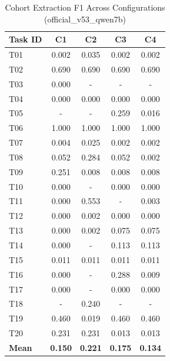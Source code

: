 \begin{table}[htbp]
\centering
\caption{Cohort Extraction F1 Across Configurations (official_v53_qwen7b)}
\label{tab:official_v53_qwen7b}
\begin{tabular}{lcccc}
\hline
\textbf{Task ID} & \textbf{C1} & \textbf{C2} & \textbf{C3} & \textbf{C4} \\
\hline
T01 & 0.002 & 0.035 & 0.002 & 0.002 \\
T02 & 0.690 & 0.690 & 0.690 & 0.690 \\
T03 & 0.000 & - & - & - \\
T04 & 0.000 & 0.000 & 0.000 & 0.000 \\
T05 & - & - & 0.259 & 0.016 \\
T06 & 1.000 & 1.000 & 1.000 & 1.000 \\
T07 & 0.004 & 0.025 & 0.002 & 0.002 \\
T08 & 0.052 & 0.284 & 0.052 & 0.002 \\
T09 & 0.251 & 0.008 & 0.008 & 0.008 \\
T10 & 0.000 & - & 0.000 & 0.000 \\
T11 & 0.000 & 0.553 & - & 0.003 \\
T12 & 0.000 & 0.002 & 0.000 & 0.000 \\
T13 & 0.000 & 0.002 & 0.075 & 0.075 \\
T14 & 0.000 & - & 0.113 & 0.113 \\
T15 & 0.011 & 0.011 & 0.011 & 0.011 \\
T16 & 0.000 & - & 0.288 & 0.009 \\
T17 & 0.000 & - & 0.000 & 0.000 \\
T18 & - & 0.240 & - & - \\
T19 & 0.460 & 0.019 & 0.460 & 0.460 \\
T20 & 0.231 & 0.231 & 0.013 & 0.013 \\
\hline
\textbf{Mean} & \textbf{0.150} & \textbf{0.221} & \textbf{0.175} & \textbf{0.134} \\
\hline
\end{tabular}
\end{table}
